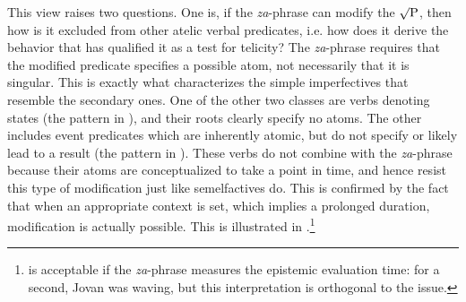 \documentclass[output=paper]{langscibook}
\begin{document}
This view raises two questions. One is, if the \textit{za}-phrase can modify the $\surd\text{P}$, then how is it excluded from other atelic verbal predicates, i.e. how does it derive the behavior that has qualified it as a test for telicity? The \textit{za}-phrase requires that the modified predicate specifies a possible atom, not necessarily that it is singular. This is exactly what characterizes the simple imperfectives that resemble the secondary ones. One of the other two classes are verbs denoting states (the pattern in ), and their roots clearly specify no atoms. The other includes event predicates which are inherently atomic, but do not specify or likely lead to a result (the pattern in ). These verbs do not combine with the \textit{za}-phrase because their atoms are conceptualized to take a point in time, and hence resist this type of modification just like semelfactives do. This is confirmed by the fact that when an appropriate context is set, which implies a prolonged duration, modification is actually possible. This is illustrated in .\footnote{ is acceptable if the \textit{za}-phrase measures the epistemic evaluation time: for a second, Jovan was waving, but this interpretation is orthogonal to the issue.}

\ea\label{ars:ex:simsem}
	\begin{xlist} 
		



	\end{xlist}
\z
\end{document}
